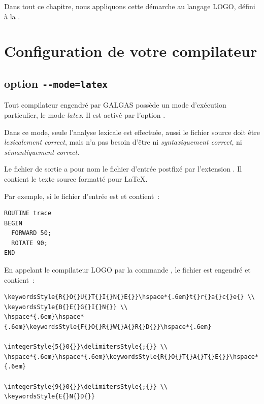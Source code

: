 Dans tout ce chapitre, nous appliquons cette démarche au langage LOGO, défini à la .





\section{Configuration de votre compilateur}

\subsection{option \texttt{-{}-mode=latex}}

Tout compilateur engendré par GALGAS possède un mode d'exécution particulier, le mode \emph{latex}. Il est activé par l'option .

Dans ce mode, seule l'analyse lexicale est effectuée, aussi le fichier source doit être \emph{lexicalement correct}, mais n'a pas besoin d'être ni \emph{syntaxiquement correct}, ni \emph{sémantiquement correct}.

Le fichier de sortie a pour nom le fichier d'entrée postfixé par l'extension . Il contient le texte source formatté pour \LaTeX.

Par exemple, si le fichier d'entrée est  et contient~:

\begin{lstlisting}
ROUTINE trace
BEGIN
  FORWARD 50;
  ROTATE 90;
END
\end{lstlisting}

En appelant le compilateur LOGO par la commande , le fichier  est engendré et contient~:

{\small
\begin{verbatim}
\keywordsStyle{R{}O{}U{}T{}I{}N{}E{}}\hspace*{.6em}t{}r{}a{}c{}e{} \\
\keywordsStyle{B{}E{}G{}I{}N{}} \\
\hspace*{.6em}\hspace*{.6em}\keywordsStyle{F{}O{}R{}W{}A{}R{}D{}}\hspace*{.6em}
                                       \integerStyle{5{}0{}}\delimitersStyle{;{}} \\
\hspace*{.6em}\hspace*{.6em}\keywordsStyle{R{}O{}T{}A{}T{}E{}}\hspace*{.6em}
                                       \integerStyle{9{}0{}}\delimitersStyle{;{}} \\
\keywordsStyle{E{}N{}D{}}
\end{verbatim}
}

